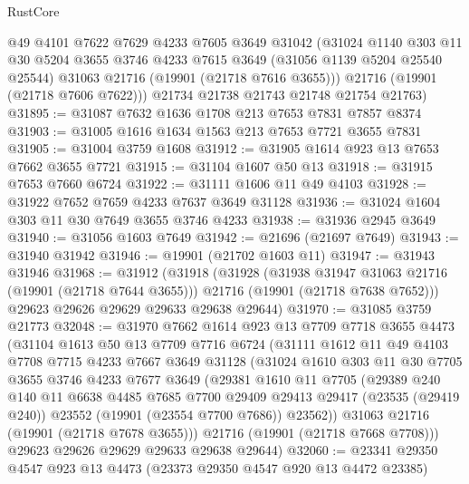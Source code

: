 \begin{lexlean}{RustCore}
\begin{coremodule}
        @49
        @4101
        @7622
        @7629
        @4233
        @7605
        @3649
        @31042
        (@31024
          @1140
          @303
          @11
          @30
          @5204
          @3655
          @3746
          @4233
          @7615
          @3649
          (@31056 @1139 @5204 @25540 @25544)
          @31063
          @21716
          (@19901 (@21718 @7616 @3655)))
        @21716
        (@19901 (@21718 @7606 @7622)))
      @21734
      @21738
      @21743
      @21748
      @21754
      @21763)
@31895 := @31087 @7632 @1636 @1708 @213 @7653 @7831 @7857 @8374
@31903 := @31005 @1616 @1634 @1563 @213 @7653 @7721 @3655 @7831
@31905 := @31004 @3759 @1608
@31912 := @31905 @1614 @923 @13 @7653 @7662 @3655 @7721
@31915 := @31104 @1607 @50 @13
@31918 := @31915 @7653 @7660 @6724
@31922 := @31111 @1606 @11 @49 @4103
@31928 := @31922 @7652 @7659 @4233 @7637 @3649 @31128
@31936 := @31024 @1604 @303 @11 @30 @7649 @3655 @3746 @4233
@31938 := @31936 @2945 @3649
@31940 := @31056 @1603 @7649
@31942 := @21696 (@21697 @7649)
@31943 := @31940 @31942
@31946 := @19901 (@21702 @1603 @11)
@31947 := @31943 @31946
@31968 := @31912
    (@31918
      (@31928
        (@31938 @31947 @31063 @21716 (@19901 (@21718 @7644 @3655)))
        @21716
        (@19901 (@21718 @7638 @7652)))
      @29623
      @29626
      @29629
      @29633
      @29638
      @29644)
@31970 := @31085 @3759 @21773
@32048 := @31970
    @7662
    @1614
    @923
    @13
    @7709
    @7718
    @3655
    @4473
    (@31104
      @1613
      @50
      @13
      @7709
      @7716
      @6724
      (@31111
        @1612
        @11
        @49
        @4103
        @7708
        @7715
        @4233
        @7667
        @3649
        @31128
        (@31024
          @1610
          @303
          @11
          @30
          @7705
          @3655
          @3746
          @4233
          @7677
          @3649
          (@29381
            @1610
            @11
            @7705
            (@29389
              @240
              @140
              @11
              @6638
              @4485
              @7685
              @7700
              @29409
              @29413
              @29417
              (@23535 (@29419 @240))
              @23552
              (@19901 (@23554 @7700 @7686))
              @23562))
          @31063
          @21716
          (@19901 (@21718 @7678 @3655)))
        @21716
        (@19901 (@21718 @7668 @7708)))
      @29623
      @29626
      @29629
      @29633
      @29638
      @29644)
@32060 := @23341 @29350 @4547 @923 @13 @4473 (@23373 @29350 @4547 @920 @13 @4472 @23385)

\end{coremodule}
\end{lexlean}
